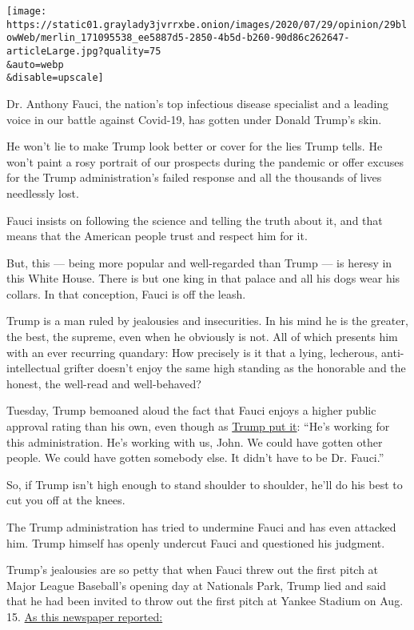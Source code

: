 \texttt{[image: https://static01.graylady3jvrrxbe.onion/images/2020/07/29/opinion/29blowWeb/merlin\_171095538\_ee5887d5-2850-4b5d-b260-90d86c262647-articleLarge.jpg?quality=75\\\&auto=webp\\\&disable=upscale]}

Dr. Anthony Fauci, the nation's top infectious disease specialist and a
leading voice in our battle against Covid-19, has gotten under Donald
Trump's skin.

He won't lie to make Trump look better or cover for the lies Trump
tells. He won't paint a rosy portrait of our prospects during the
pandemic or offer excuses for the Trump administration's failed response
and all the thousands of lives needlessly lost.

Fauci insists on following the science and telling the truth about it,
and that means that the American people trust and respect him for it.

But, this --- being more popular and well-regarded than Trump --- is
heresy in this White House. There is but one king in that palace and all
his dogs wear his collars. In that conception, Fauci is off the leash.

Trump is a man ruled by jealousies and insecurities. In his mind he is
the greater, the best, the supreme, even when he obviously is not. All
of which presents him with an ever recurring quandary: How precisely is
it that a lying, lecherous, anti-intellectual grifter doesn't enjoy the
same high standing as the honorable and the honest, the well-read and
well-behaved?

Tuesday, Trump bemoaned aloud the fact that Fauci enjoys a higher public
approval rating than his own, even though as
\href{https://www.whitehouse.gov/briefings-statements/remarks-president-trump-press-briefing-july-28-2020/}{Trump
put it}: ``He's working for this administration. He's working with us,
John. We could have gotten other people. We could have gotten somebody
else. It didn't have to be Dr. Fauci.''

So, if Trump isn't high enough to stand shoulder to shoulder, he'll do
his best to cut you off at the knees.

The Trump administration has tried to undermine Fauci and has even
attacked him. Trump himself has openly undercut Fauci and questioned his
judgment.

Trump's jealousies are so petty that when Fauci threw out the first
pitch at Major League Baseball's opening day at Nationals Park, Trump
lied and said that he had been invited to throw out the first pitch at
Yankee Stadium on Aug. 15.
\href{https://www.nytimes3xbfgragh.onion/2020/07/27/us/politics/trump-yankees-fauci.html}{As
this newspaper reported:}

